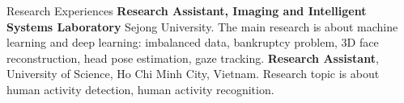 \begin{rubric}{Research Experiences}
\entry*[03/2016 -- Present]%
	\textbf{Research Assistant, Imaging and Intelligent Systems Laboratory} Sejong University. The main research is about machine learning and deep learning: imbalanced data, bankruptcy problem, 3D face reconstruction, head pose estimation, gaze tracking.
%
%
\entry*[02/2016 -- 08/2016]%
	\textbf{Research Assistant}, University of Science, Ho Chi Minh City, Vietnam. Research topic is about human activity detection, human activity recognition.
%
\end{rubric}